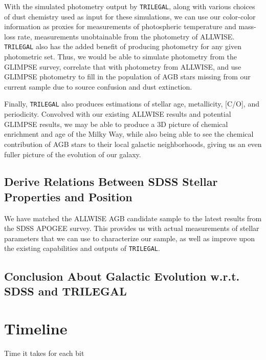 With the simulated photometry output by {\tt TRILEGAL}, along with various choices of dust chemistry used as input for these simulations, we can use our color-color information as proxies for measurements of photospheric temperature and mass-loss rate, measurements unobtainable from the photometry of ALLWISE. {\tt TRILEGAL} also has the added benefit of producing photometry for any given photometric set. Thus, we would be able to simulate photometry from the GLIMPSE survey, correlate that with photometry from ALLWISE, and use GLIMPSE photometry to fill in the population of AGB stars missing from our current sample due to source confusion and dust extinction. 

Finally, {\tt TRILEGAL} also produces estimations of stellar age, metallicity, [C/O], and periodicity. Convolved with our existing ALLWISE results and potential GLIMPSE results, we may be able to produce a 3D picture of chemical enrichment and age of the Milky Way, while also being able to see the chemical contribution of AGB stars to their local galactic neighborhoods, giving us an even fuller picture of the evolution of our galaxy.

\subsection{Derive Relations Between SDSS Stellar Properties and Position}
We have matched the ALLWISE AGB candidate sample to the latest results from the SDSS APOGEE survey. This provides us with actual measurements of stellar parameters that we can use to characterize our sample, as well as improve upon the existing capabilities and outputs of {\tt TRILEGAL}.

\subsection{Conclusion About Galactic Evolution w.r.t. SDSS and TRILEGAL}

\section{Timeline}
Time it takes for each bit

